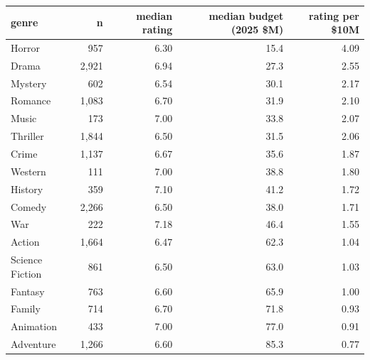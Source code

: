\begin{tabular}{lrrrr}
\toprule
genre & n & median rating & median budget (2025 \$M) & rating per \$10M \\
\midrule
Horror & 957 & 6.30 & 15.4 & 4.09 \\
Drama & 2{,}921 & 6.94 & 27.3 & 2.55 \\
Mystery & 602 & 6.54 & 30.1 & 2.17 \\
Romance & 1{,}083 & 6.70 & 31.9 & 2.10 \\
Music & 173 & 7.00 & 33.8 & 2.07 \\
Thriller & 1{,}844 & 6.50 & 31.5 & 2.06 \\
Crime & 1{,}137 & 6.67 & 35.6 & 1.87 \\
Western & 111 & 7.00 & 38.8 & 1.80 \\
History & 359 & 7.10 & 41.2 & 1.72 \\
Comedy & 2{,}266 & 6.50 & 38.0 & 1.71 \\
War & 222 & 7.18 & 46.4 & 1.55 \\
Action & 1{,}664 & 6.47 & 62.3 & 1.04 \\
Science Fiction & 861 & 6.50 & 63.0 & 1.03 \\
Fantasy & 763 & 6.60 & 65.9 & 1.00 \\
Family & 714 & 6.70 & 71.8 & 0.93 \\
Animation & 433 & 7.00 & 77.0 & 0.91 \\
Adventure & 1{,}266 & 6.60 & 85.3 & 0.77 \\
\bottomrule
\end{tabular}
